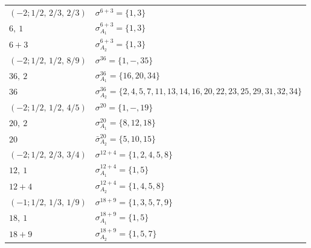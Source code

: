 \documentclass[10pt,a4paper]{amsart}
\theoremstyle{definition}
\numberwithin{equation}{section}
\begin{document}
\begin{table}[!t]
\begin{tabular}{|ll|}
\hline
$(-2;1/2,\,2/3,\,2/3) $& $\sigma^{6 + 3} = \{1,3\}$ \\
$6,\ 1$& $\sigma_{A_{1}}^{6 + 3} = \{1,3\}$ \\
$6 + 3$ & $\sigma_{A_{2}}^{6 + 3} = \{1,3\}$ \\
\hline
$(-2;1/2,\,1/2,\,8/9) $& $\sigma^{36} = \{1,-,35\}$ \\
$36,\ 2$& $\sigma_{A_{1}}^{36} = \{16,20,34\}$ \\
$36$ & $\sigma_{A_{2}}^{36} = \{2,4,5,7,11,13,14,16,20,22,23,25,29,31,32,34\}$ \\
\hline
$(-2;1/2,\,1/2,\,4/5) $& $\sigma^{20} = \{1,-,19\}$ \\
$20,\ 2$& $\sigma_{A_{1}}^{20} = \{8,12,18\}$ \\
$20$ & $\bar\sigma_{A_{2}}^{20} = \{5,10,15\}$ \\
\hline
$(-2;1/2,\,2/3,\,3/4) $& $\sigma^{12 + 4} = \{1,2,4,5,8\}$ \\
$12,\ 1$& $\sigma_{A_{1}}^{12 + 4} = \{1,5\}$ \\
$12 + 4$ & $\sigma_{A_{2}}^{12 + 4} = \{1,4,5,8\}$ \\
\hline
$(-1;1/2,\,1/3,\,1/9) $& $\sigma^{18 + 9} = \{1,3,5,7,9\}$ \\
$18,\ 1$& $\sigma_{A_{1}}^{18 + 9} = \{1,5\}$ \\
$18 + 9$ & $\sigma_{A_{2}}^{18 + 9} = \{1,5,7\}$ \\
\hline
\end{tabular}
\end{table}
\end{document}
